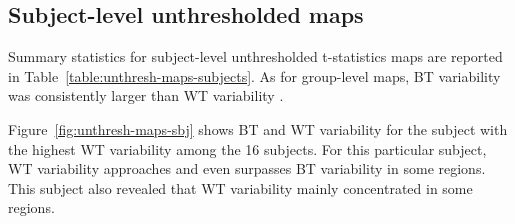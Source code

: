 \documentclass[conference]{IEEEtran}
\begin{document}
  \begin{figure}[ht]
  \end{figure}

  \subsection{Subject-level unthresholded maps}

  Summary statistics for subject-level unthresholded t-statistics maps are
  reported in Table~\ref{table:unthresh-maps-subjects}. As for group-level
  maps, BT variability was consistently larger than WT variability
  .

  Figure~\ref{fig:unthresh-maps-sbj} shows BT and WT variability for
  the subject with the highest WT variability among the 16 subjects. For
  this particular subject, WT variability approaches and even surpasses BT
  variability in some regions. This subject also revealed that WT
  variability mainly concentrated in some regions.
\end{document}
